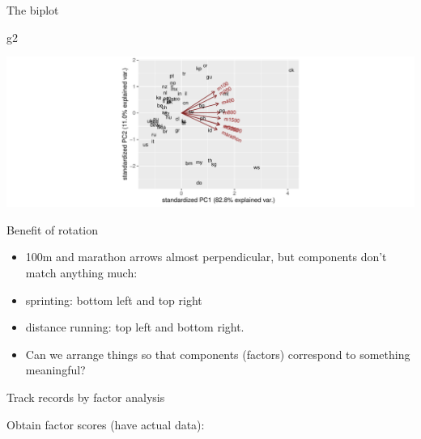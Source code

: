 \documentclass[
  ignorenonframetext,
]{beamer}
\newenvironment{Shaded}{\begin{snugshade}}{\end{snugshade}}
\newcommand{\DataTypeTok}[1]{\textcolor[rgb]{0.13,0.29,0.53}{#1}}
\newcommand{\DecValTok}[1]{\textcolor[rgb]{0.00,0.00,0.81}{#1}}
\newcommand{\KeywordTok}[1]{\textcolor[rgb]{0.13,0.29,0.53}{\textbf{#1}}}
\newcommand{\NormalTok}[1]{#1}
\newcommand{\OperatorTok}[1]{\textcolor[rgb]{0.81,0.36,0.00}{\textbf{#1}}}
\newcommand{\StringTok}[1]{\textcolor[rgb]{0.31,0.60,0.02}{#1}}
\begin{document}
\begin{frame}[fragile]{The biplot}
\protect\hypertarget{the-biplot-2}{}

\begin{Shaded}
\begin{Highlighting}[]
\NormalTok{g2}
\end{Highlighting}
\end{Shaded}

\includegraphics{slides_d29_files/figure-beamer/unnamed-chunk-453-1.pdf}

\end{frame}

\begin{frame}{Benefit of rotation}
\protect\hypertarget{benefit-of-rotation}{}

\begin{itemize}
\item
  100m and marathon arrows almost perpendicular, but components don't
  match anything much:
\item
  sprinting: bottom left and top right
\item
  distance running: top left and bottom right.
\item
  Can we arrange things so that components (factors) correspond to
  something meaningful?
\end{itemize}

\end{frame}

\begin{frame}[fragile]{Track records by factor analysis}
\protect\hypertarget{track-records-by-factor-analysis}{}

Obtain factor scores (have actual data):

\normalsize

\begin{Shaded}
\end{Shaded}

\normalsize

\end{frame}
\end{document}
